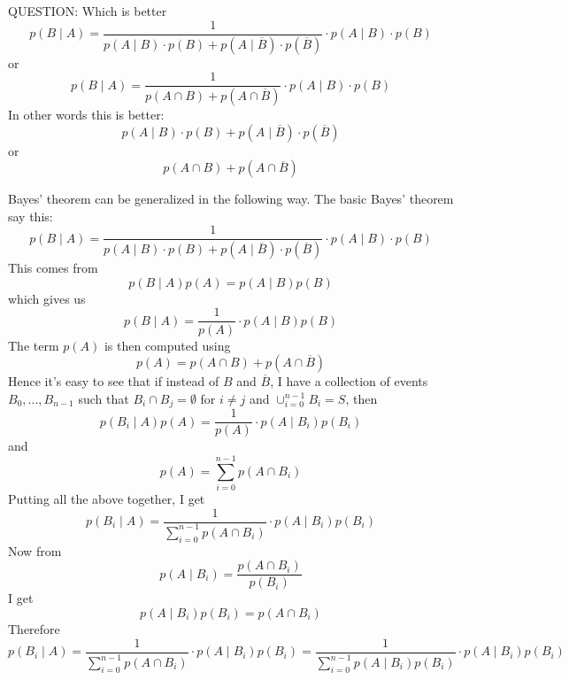 QUESTION:
Which is better
\[
p(B \mid A) 
=  
\frac{1}{p(A \mid  B) \cdot p(B) + p(A \mid  \overline B) \cdot p(\overline B)}
\cdot 
p(A \mid  B) \cdot p(B)
\]
or
\[
p(B \mid A) 
=  
\frac{1}{p(A \cap B) + p(A \cap \overline{B})}
\cdot 
p(A \mid  B) \cdot p(B)
\]
In other words this is better:
\[
p(A \mid  B) \cdot p(B) + p(A \mid  \overline B) \cdot p(\overline B)
\]
or
\[
p(A \cap B) + p(A \cap \overline{B})
\]

Bayes' theorem can be generalized in the following way.
The basic Bayes' theorem say this:
\[
p(B \mid A) 
=  
\frac{1}{p(A \mid  B) \cdot p(B) + p(A \mid  \overline B) \cdot p(\overline B)}
\cdot 
p(A \mid  B) \cdot p(B)
\]
This comes from
\[
p(B \mid A) p(A) = 
p(A \mid B) p(B) 
\]
which gives us
\[
p(B \mid A)  =
\frac{1}{p(A)} \cdot
p(A \mid B) p(B) 
\]
The term $p(A)$ is then computed using
\[
p(A) = p(A \cap B) + p(A \cap \overline{B}) 
\]
Hence it's easy to see that if instead of $B$ and $\overline B$,
I have a collection of events $B_0, ..., B_{n-1}$ such that
$B_i \cap B_j = \emptyset$ for $i \neq j$ and
$\cup_{i=0}^{n-1}B_i = S$, then
\[
p(B_i \mid A) p(A) =
\frac{1}{p(A)} \cdot
p(A \mid B_i) p(B_i) 
\]
and
\[
p(A) = \sum_{i=0}^{n-1} p(A \cap B_i)  
\]
Putting all the above together, I get
\[
p(B_i \mid A)  =
\frac{1}{\sum_{i=0}^{n-1} p(A \cap B_i)} \cdot
p(A \mid B_i) p(B_i) 
\]
Now from
\[
p(A \mid B_i) = \frac{p(A \cap B_i)}{p(B_i)} 
\]
I get
\[
p(A \mid B_i) p(B_i) =  p(A \cap B_i) 
\]
Therefore
\[
p(B_i \mid A)
=
\frac{1}{\sum_{i=0}^{n-1} p(A \cap B_i)} \cdot
p(A \mid B_i) p(B_i)
=
\frac{1}{\sum_{i=0}^{n-1} p(A \mid B_i) p(B_i)} \cdot
p(A \mid B_i) p(B_i)
\]
